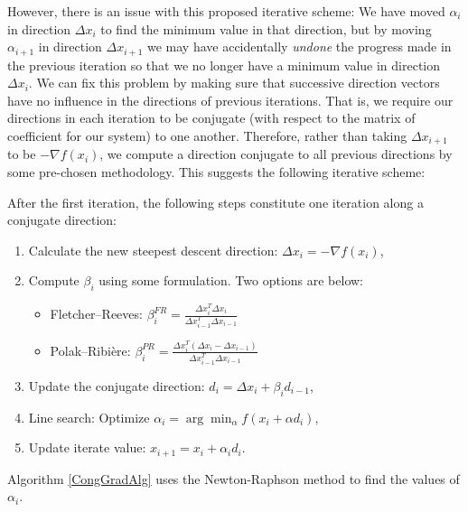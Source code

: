 However, there is an issue with this proposed iterative scheme: We have moved $\alpha_i$ in direction $\Delta x_i$ to find the minimum value in that direction, but by moving $\alpha_{i+1}$ in direction $\Delta x_{i+1}$ we may have accidentally \textit{undone} the progress made in the previous iteration so that we no longer have a minimum value in direction $\Delta x_i$. We can fix this problem by making sure that successive direction vectors have no influence in the directions of previous iterations. That is, we require our directions in each iteration to be conjugate (with respect to the matrix of coefficient for our system) to one another. Therefore, rather than taking $\Delta x_{i+1}$ to be $-\nabla f(x_i)$, we compute a direction conjugate to all previous directions by some pre-chosen methodology. This suggests the following iterative scheme:

After the first iteration, the following steps constitute one iteration along a conjugate direction:
\begin{enumerate}
	\item Calculate the new steepest descent direction: $\Delta x_i=-\nabla f(x_i)$,
	\item Compute $\beta_i$ using some formulation. Two options are below:
	\begin{itemize}
		\item Fletcher--Reeves: $\beta_i^{FR}=\frac{\Delta x_i^T\Delta x_i}{\Delta x_{i-1}^T\Delta x_{i-1}}$
		\item Polak--Ribi\`{e}re: $\beta_{i}^{PR}=\frac{\Delta x_i^T(\Delta x_i-\Delta x_{i-1})}{\Delta x_{i-1}^T\Delta x_{i-1}}$
	\end{itemize}
	\item Update the conjugate direction: $d_i=\Delta x_i+\beta_i d_{i-1}$,
	\item Line search: Optimize $\alpha_i =\arg\min_{\alpha} f(x_i+\alpha d_i)$,
	\item Update iterate value: $x_{i+1}=x_i+\alpha_i d_i$.
\end{enumerate}

Algorithm \ref{CongGradAlg} uses the Newton-Raphson method to find the values of $\alpha_i$.

